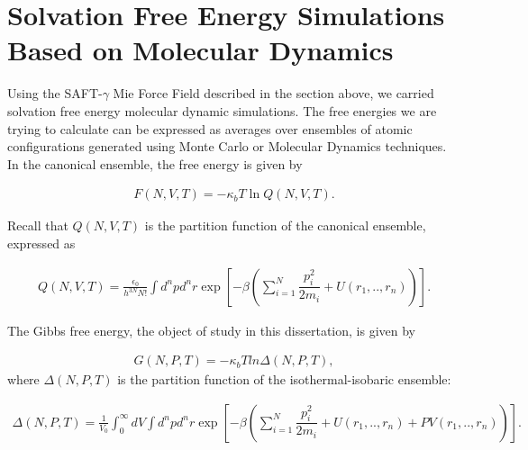 \section{Solvation Free Energy Simulations Based on Molecular Dynamics}
	
    Using the SAFT-$\gamma$ Mie Force Field described in the section above, we carried solvation free energy molecular dynamic simulations. The free energies we are trying to calculate can be expressed as averages over ensembles of atomic configurations generated using Monte Carlo or Molecular Dynamics techniques. In the canonical ensemble, the free energy is given by  
    
    \begin{equation}
    \label{eq:fcano}
    \begin{aligned}
    F(N,V,T) = -\kappa_{b}T \ln Q(N,V,T).
    \end{aligned}
    \end{equation}
    
    Recall that $Q(N,V,T)$ is the partition function of the canonical ensemble, expressed as
    
    \begin{equation}
    \label{eq:partican}
    \begin{aligned}
    Q(N,V,T) =\frac{\epsilon_{0}}{h^{3N}N!} \int d^{n}p d^{n}r \exp \left[ -\beta \left( \sum_{i=1}^{N}\dfrac{p_{i}^{2}}{2m_{i}} + U(r_{1},..,r_{n}) \right)
    \right] .
    \end{aligned}
    \end{equation}
    
    The Gibbs free energy, the object of study in this dissertation, is given by
    
    \begin{equation}
    \begin{aligned}
    G(N,P,T) = -\kappa_{b}T ln \Delta (N,P,T),
    \end{aligned}
    \end{equation}
    where $\Delta (N,P,T)$ is the partition function of the isothermal-isobaric ensemble:
    
    \begin{equation}
    \begin{aligned}
    \Delta (N,P,T) = \frac{1}{V_{0}} \int_{0}^{\infty} dV \int d^{n}p d^{n}r \exp \left[ -\beta \left( \sum_{i=1}^{N}\dfrac{p_{i}^{2}}{2m_{i}} + U(r_{1},..,r_{n}) + PV(r_{1},..,r_{n}) \right) \right].
    \end{aligned}
    \end{equation}
    
